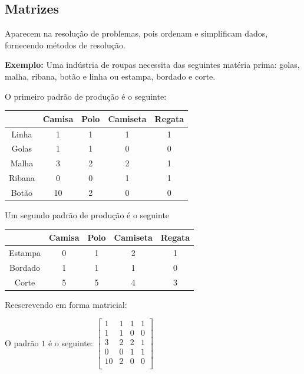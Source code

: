 \documentclass[oneside,a4paper,12pt]{article}
\begin{document}
\begin{snugshade}
	\section{Matrizes}
\end{snugshade}

Aparecem na resolução de problemas, pois ordenam e simplificam dados, fornecendo métodos de resolução.

\textbf{Exemplo: }Uma indústria de roupas necessita das seguintes matéria prima: golas, malha, ribana, botão e linha ou estampa, bordado e corte.

O primeiro padrão de produção é o seguinte:
\begin{table}[h]
	\centering
\begin{tabular}{|c|c|c|c|c|}
	\hline
		&	Camisa		&	Polo	&	Camiseta& 	Regata\\
	\hline
Linha	&	1			&	1		&	1		&	1	\\	
	\hline
Golas	&	1			&	1		&	0		&	0	\\
	\hline
Malha	&	3			&	2		&	2		&	1	\\
	\hline
Ribana	&	0			&	0		&	1		&	1	\\
	\hline
Botão	&	10			&	2		&	0		&	0	\\
	\hline			
\end{tabular}
\end{table}

Um segundo padrão de produção é o seguinte
\begin{table}[h]
	\centering
	\begin{tabular}{|c|c|c|c|c|}
		\hline
				&	Camisa		&	Polo	&	Camiseta& 	Regata\\
		\hline
		Estampa	&	0			&	1		&	2		&	1	\\	
		\hline
		Bordado	&	1			&	1		&	1		&	0	\\
		\hline
		Corte	&	5			&	5		&	4		&	3	\\
		\hline
	\end{tabular}
\end{table}

Reescrevendo em forma matricial:

O padrão $1$ é o seguinte:
	$\left[
	\begin{array}{cccc}		
	1			&	1		&	1		&	1	\\	
	1			&	1		&	0		&	0	\\
	3			&	2		&	2		&	1	\\
	0			&	0		&	1		&	1	\\
	10			&	2		&	0		&	0	\\		
	\end{array}
	\right]
	$
	
\end{document}
